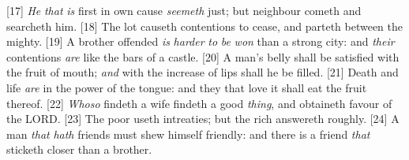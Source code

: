 [17] \textcolor[cmyk]{0.99998,1,0,0}{\emph{He} \emph{that} \emph{is} first in  own cause \emph{seemeth} just; but  neighbour cometh and searcheth him.}
[18] \textcolor[cmyk]{0.99998,1,0,0}{The lot causeth contentions to cease, and parteth between the mighty.}
[19] \textcolor[cmyk]{0.99998,1,0,0}{A brother offended \emph{is} \emph{harder} \emph{to} \emph{be} \emph{won} than a strong city: and \emph{their} contentions \emph{are} like the bars of a castle.}
[20] \textcolor[cmyk]{0.99998,1,0,0}{A man's belly shall be satisfied with the fruit of  mouth; \emph{and} with the increase of  lips shall he be filled.}
[21] \textcolor[cmyk]{0.99998,1,0,0}{Death and life \emph{are} in the power of the tongue: and they that love it shall eat the fruit thereof.}
[22] \textcolor[cmyk]{0.99998,1,0,0}{\emph{Whoso} findeth a wife findeth a good \emph{thing}, and obtaineth favour of the LORD.}
[23] \textcolor[cmyk]{0.99998,1,0,0}{The poor useth intreaties; but the rich answereth roughly.}
[24] \textcolor[cmyk]{0.99998,1,0,0}{A man \emph{that} \emph{hath} friends must shew himself friendly: and there is a friend \emph{that} sticketh closer than a brother.}


